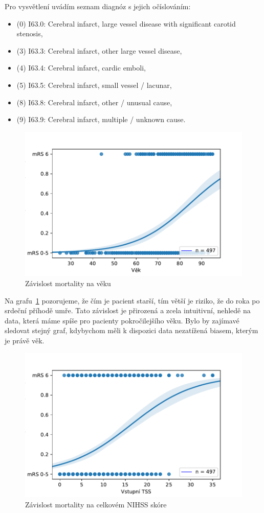 Pro vysvětlení uvádím seznam diagnóz s jejich očíslováním:

\begin{itemize}
    \item (0) I63.0: Cerebral infarct, large vessel disease with significant carotid stenosis,
    \item (3) I63.3: Cerebral infarct, other large vessel disease,
    \item (4) I63.4: Cerebral infarct, cardic emboli,
    \item (5) I63.5: Cerebral infarct, small vessel / lacunar,
    \item (8) I63.8: Cerebral infarct, other / unusual cause,
    \item (9) I63.9: Cerebral infarct, multiple / unknown cause.
\end{itemize}

\begin{figure}[htbp]
    \includegraphics[width=.6\textwidth]{img/image_3.pdf}
    \centering
    \caption{Závislost mortality na věku}
    \label{img:mrs-age}
\end{figure}
\FloatBarrier

Na grafu~\ref{img:mrs-age} pozorujeme, že čím je pacient starší, tím větší je riziko, že do roka po srdeční příhodě umře.
Tato závislost je přirozená a zcela intuitivní, nehledě na data, která máme spíše pro pacienty pokročilejšího věku.
Bylo by zajímavé sledovat stejný graf, kdybychom měli k dispozici data nezatížená biasem, kterým je právě věk.

\begin{figure}[htbp]
    \includegraphics[width=.6\textwidth]{img/image_4.pdf}
    \centering
    \caption{Závislost mortality na celkovém NIHSS skóre}
    \label{img:mrs-tss}
\end{figure}
\FloatBarrier

